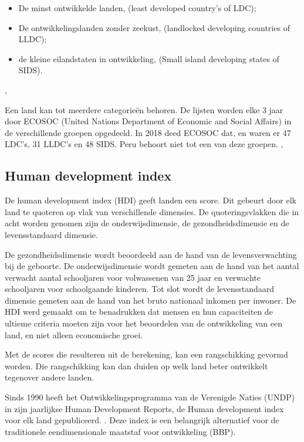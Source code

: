 \begin{itemize}
\item De minst ontwikkelde landen, (least developed country's of LDC);
\item De ontwikkelingslanden zonder zeekust, (landlocked developing countries of LLDC);
\item de kleine eilandstaten in ontwikkeling, (Small island developing states of SIDS).
\end{itemize}
\autocite{MarcJ.Bossuyt2005},

Een land kan tot meerdere categorieën behoren. De lijsten worden elke 3 jaar door ECOSOC (United Nations Department of Economic and Social Affairs) in de verschillende groepen opgedeeld. \autocite{ecosoc2018} In 2018 deed ECOSOC dat, en waren er 47 LDC's, 31 LLDC's en 48 SIDS. Peru behoort niet tot een van deze groepen. \autocite{MarcJ.Bossuyt2005},

\subsection{Human development index}
De human development index (HDI) geeft landen een score. Dit gebeurt door elk land te quoteren op vlak van verschillende dimensies. De quoteringsvlakken die in acht worden genomen zijn de onderwijsdimensie, de gezondheidsdimensie en de levensstandaard dimensie.

De gezondheidsdimensie wordt beoordeeld aan de hand van de levensverwachting bij de geboorte. De onderwijsdimensie wordt gemeten aan de hand van het aantal verwacht aantal schooljaren voor volwassenen van 25 jaar en verwachte schooljaren voor schoolgaande kinderen. Tot slot wordt de levensstandaard dimensie gemeten aan de hand van het bruto nationaal inkomen per inwoner. De HDI werd gemaakt om te benadrukken dat mensen en hun capaciteiten de ultieme criteria moeten zijn voor het beoordelen van de ontwikkeling van een land, en niet alleen economische groei. \autocite{UNDP2019}

Met de scores die resulteren uit de berekening, kan een rangschikking gevormd worden. Die rangschikking kan dan duiden op welk land beter ontwikkelt tegenover andere landen. 

Sinds 1990 heeft het Ontwikkelingsprogramma van de Verenigde Naties (UNDP) in zijn jaarlijkse Human Development Reports, de Human development index voor elk land gepubliceerd. \autocite{AmbujD.Sagar1997}. Deze index is een belangrijk alternatief voor de traditionele eendimensionale maatstaf voor ontwikkeling (BBP). 

